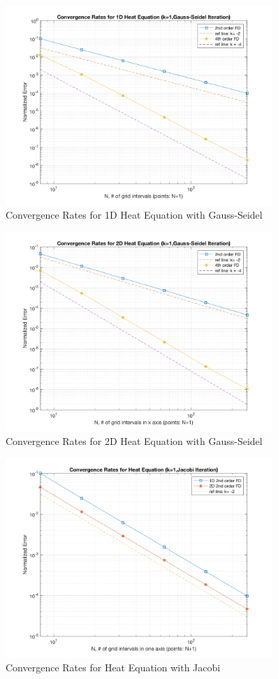 \documentclass[a4paper]{article}
\begin{document}
\begin{figure}
\centering
\includegraphics[width=0.9\textwidth]{gauss_1d.png}
\caption{\label{gauss_1d}Convergence Rates for 1D Heat Equation with Gauss-Seidel}
\end{figure}

\begin{figure}
\centering
\includegraphics[width=0.9\textwidth]{gauss_2d.png}
\caption{\label{gauss_2d}Convergence Rates for 2D Heat Equation with Gauss-Seidel}
\end{figure}

\begin{figure}
\centering
\includegraphics[width=0.9\textwidth]{jacobi.png}
\caption{\label{jacobi}Convergence Rates for Heat Equation with Jacobi}
\end{figure}
\newpage
\end{document}
